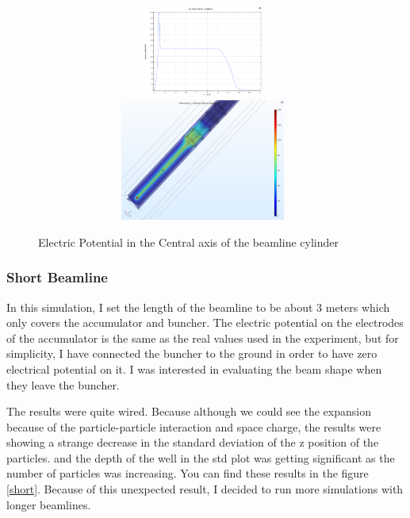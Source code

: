 \documentclass[12pt,a4paper]{article}
\begin{document}
\begin{figure}[h]

\centering
\includegraphics[width=110mm, height=30mm]{potential}
\includegraphics[width=110mm, height=40mm]{potential-3D}
\caption{Electric Potential in the Central axis of the beamline cylinder}
\label{potential}
\end{figure}

\subsubsection{Short Beamline}
In this simulation, I set the length of the beamline to be about 3 meters which only covers the accumulator and buncher. The electric potential on the electrodes of the accumulator is the same as the real values used in the experiment, but for simplicity, I have connected the buncher to the ground in order to have zero electrical potential on it. I was interested in evaluating the beam shape when they leave the buncher.

The results were quite wired. Because although we could see the expansion because of the particle-particle interaction and space charge, the results were showing a strange decrease in the standard deviation of the z position of the particles. and the depth of the well in the std plot was getting significant as the number of particles was increasing. You can find these results in the figure \ref{short}. Because of this unexpected result, I decided to run more simulations with longer beamlines.
\end{document}
